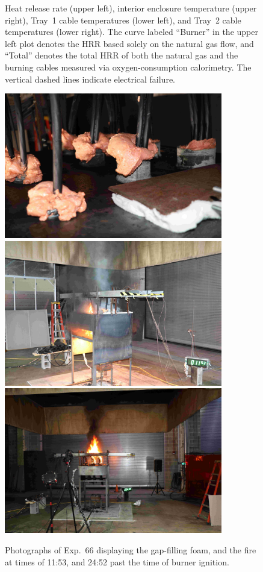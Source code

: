 \begin{figure}[H]
\caption[HRR and temperatures of Exp.~66]{Heat release rate (upper left), interior enclosure temperature (upper right), Tray~1 cable temperatures (lower left), and Tray~2 cable temperatures (lower right). The curve labeled ``Burner'' in the upper left plot denotes the HRR based solely on the natural gas flow, and ``Total'' denotes the total HRR of both the natural gas and the burning cables measured via oxygen-consumption calorimetry. The vertical dashed lines indicate electrical failure.}
\label{fig:Test_66}
\end{figure}

\begin{figure}[p]
\centering
\includegraphics[height=2.50in]{../FIGURES/Test_66_Photo_1} \\ \vspace{0.1in}
\includegraphics[height=2.50in]{../FIGURES/Test_66_Photo_2} \\ \vspace{0.1in}
\includegraphics[height=2.50in]{../FIGURES/Test_66_Photo_3}
\caption[Photographs of Exp.~66]{Photographs of Exp.~66 displaying the gap-filling foam, and the fire at times of 11:53, and 24:52 past the time of burner ignition.}
\label{fig:Test_66_photos}
\end{figure}




